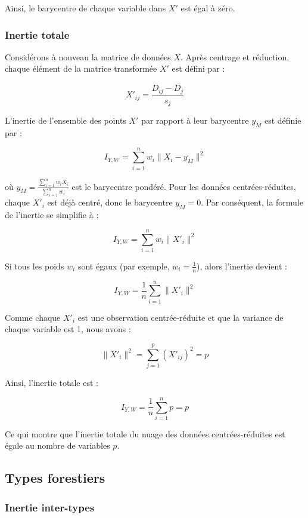 \documentclass[
]{article}
\begin{document}
Ainsi, le barycentre de chaque variable dans \(X'\) est égal à zéro.

\hypertarget{inertie-totale}{%
\subsubsection{Inertie totale}\label{inertie-totale}}

Considérons à nouveau la matrice de données \(X\). Après centrage et
réduction, chaque élément de la matrice transformée \(X'\) est défini
par :

\[
X'_{ij} = \frac{D_{ij} - \bar{D_{j}}}{s_{j}}
\]

L'inertie de l'ensemble des points \(X'\) par rapport à leur barycentre
\(y_M\) est définie par :

\[
I_{Y,W} = \sum_{i=1}^{n} w_{i} \|X_{i} - y_M\|^{2}
\]

où \(y_M = \frac{\sum_{i=1}^{n} w_{i} X_{i}}{\sum_{i=1}^{n} w_{i}}\) est
le barycentre pondéré. Pour les données centrées-réduites, chaque
\(X'_{i}\) est déjà centré, donc le barycentre \(y_M = 0\). Par
conséquent, la formule de l'inertie se simplifie à :

\[
I_{Y,W} = \sum_{i=1}^{n} w_{i} \|X'_{i}\|^{2}
\]

Si tous les poids \(w_{i}\) sont égaux (par exemple,
\(w_{i} = \frac{1}{n}\)), alors l'inertie devient :

\[
I_{Y,W} = \frac{1}{n} \sum_{i=1}^{n} \|X'_{i}\|^{2}
\]

Comme chaque \(X'_{i}\) est une observation centrée-réduite et que la
variance de chaque variable est 1, nous avons :

\[
\|X'_{i}\|^{2} = \sum_{j=1}^{p} (X'_{ij})^{2} = p
\]

Ainsi, l'inertie totale est :

\[
I_{Y,W} = \frac{1}{n} \sum_{i=1}^{n} p = p
\]

Ce qui montre que l'inertie totale du nuage des données
centrées-réduites est égale au nombre de variables \(p\).

\hypertarget{types-forestiers}{%
\subsection{Types forestiers}\label{types-forestiers}}

\hypertarget{inertie-inter-types}{%
\subsubsection{Inertie inter-types}\label{inertie-inter-types}}
\end{document}
